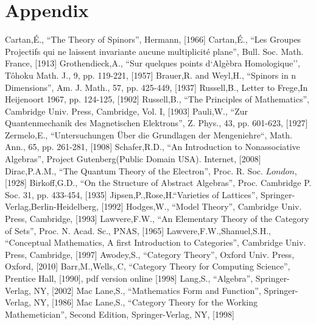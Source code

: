 \documentclass[aps,twocolumn,secnumarabic,nobalancelastpage,amsmath,amssymb,
amsthm,nofootinbib,parskip=full]{revtex4}
\numberwithin{equation}{section}
\begin{document}
\section{Appendix}




\begin{thebibliography}{99}
Cartan,\'{E}., ``The Theory of Spinors'', Hermann, [1966]
Cartan,\'{E}., ``Les Groupes Projectifs qui ne laissent
  invariante aucune multiplicit\'{e} plane'', Bull. Soc. Math. France, [1913]
Grothendieck,A., ``Sur quelques points d`Alg\`{e}bra Homologique'', T\^{o}hoku Math. J., 9, pp. 119-221, [1957]
Brauer,R. and Weyl,H., ``Spinors in n Dimensions'', Am. J. Math., 57, pp. 425-449, [1937]
Russell,B., Letter to Frege,In Heijenoort 1967, pp. 124-125, [1902]
Russell,B., ``The Principles of Mathematics'', Cambridge Univ. Press, Cambridge, Vol. I, [1903]
Pauli,W., ``Zur Quantenmechanik des Magnetischen Elektrons'', Z. Phys., 43, pp. 601-623, [1927]
Zermelo,E., ``Untersuchungen \"{U}ber die Grundlagen der Mengeniehre``, Math. Ann., 65, pp. 261-281, [1908]
Schafer,R.D., ``An Introduction to Nonassociative Algebras'', Project Gutenberg(Public Domain USA). Internet, [2008]
Dirac,P.A.M., ``The Quantum Theory of the Electron'', Proc. R. Soc. \(London\), [1928]
Birkoff,G.D., ``On the Structure of Abstract Algebras'', Proc. Cambridge P. Soc. 31, pp. 433-454, [1935]
Jipsen,P.,Rose,H.``Varieties of Lattices'', Springer-Verlag,Berlin-Heidelberg, [1992]
Hodges,W., ``Model Theory'', Cambridge Univ. Press, Cambridge, [1993]
Lawvere,F.W., ``An Elementary Theory of the Category of Sets'', Proc. N. Acad. Sc., PNAS, [1965]
Lawvere,F.W.,Shanuel,S.H., ``Conceptual Mathematics, A first Introduction to Categories'', Cambridge Univ. Press, Cambridge, [1997]
Awodey,S., ``Category Theory'', Oxford Univ. Press, Oxford, [2010]
Barr,M.,Wells,.C, ``Category Theory for Computing Science'', Prentice Hall, [1990], pdf version online [1998]
Lang,S., ``Algebra'', Springer-Verlag, NY, [2002]
Mac Lane,S., ``Mathematics Form and Function'', Springer-Verlag, NY, [1986]
Mac Lane,S., ``Category Theory for the Working Mathemetician'', Second Edition, Springer-Verlag, NY, [1998]

\end{thebibliography}
\end{document}
